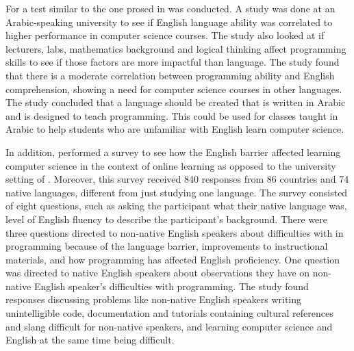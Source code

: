 \documentclass[10pt,twocolumn]{article}
\begin{document}
For \textcite{Idris2018Correlation} a test similar to the one prosed in \textcite{Veerasamy2014Teaching} was conducted. A study was done at an Arabic-speaking university to see if English language ability was correlated to higher performance in computer science courses. The study also looked at if lecturers, labs, mathematics background and logical thinking affect programming skills to see if those factors are more impactful than language. The study found that there is a moderate correlation between programming ability and English comprehension, showing a need for computer science courses in other languages. The study concluded that a language should be created that is written in Arabic and is designed to teach programming. This could be used for classes taught in Arabic to help students who are unfamiliar with English learn computer science.

In addition, \textcite{Guo2018Non} performed a survey to see how the English barrier affected learning computer science in the context of online learning as opposed to the university setting of \textcite{Idris2018Correlation}. Moreover, this survey received 840 responses from 86 countries and 74 native languages, different from just studying one language. The survey consisted of eight questions, such as asking the participant what their native language was, level of English fluency to describe the participant's background. There were three questions directed to non-native English speakers about difficulties with in programming because of the language barrier, improvements to instructional materials, and how programming has affected English proficiency. One question was directed to native English speakers about observations they have on non-native English speaker's difficulties with programming. The study found responses discussing problems like non-native English speakers writing unintelligible code, documentation and tutorials containing cultural references and slang difficult for non-native speakers, and learning computer science and English at the same time being difficult.
\end{document}
